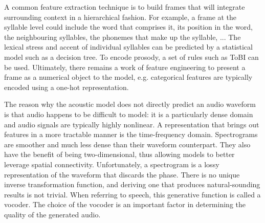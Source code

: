 \documentclass[a4paper, oneside, 12pt, english]{article}
\begin{document}
A common feature extraction technique is to build frames that will integrate surrounding context in a hierarchical fashion. For example, a frame at the syllable level could include the word that comprises it, its position in the word, the neighbouring syllables, the phonemes that make up the syllable, ... The lexical stress and accent of individual syllables can be predicted by a statistical model such as a decision tree. To encode prosody, a set of rules such as ToBI \citep{TOBI} can be used. Ultimately, there remains a work of feature engineering to present a frame as a numerical object to the model, e.g. categorical features are typically encoded using a one-hot representation.

The reason why the acoustic model does not directly predict an audio waveform is that audio happens to be difficult to model: it is a particularly dense domain and audio signals are typically highly nonlinear. A representation that brings out features in a more tractable manner is the time-frequency domain. Spectrograms are smoother and much less dense than their waveform counterpart. They also have the benefit of being two-dimensional, thus allowing models to better leverage spatial connectivity. Unfortunately, a spectrogram is a lossy representation of the waveform that discards the phase. There is no unique inverse transformation function, and deriving one that produces natural-sounding results is not trivial. When referring to speech, this generative function is called a vocoder. The choice of the vocoder is an important factor in determining the quality of the generated audio.
\end{document}

